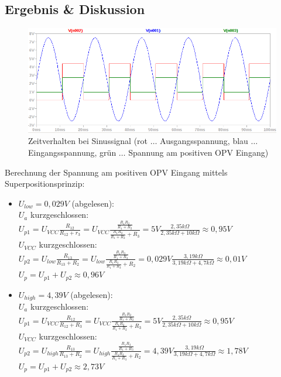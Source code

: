 \documentclass[12pt,a4paper,titlepage]{article}
\begin{document}
\subsection{Ergebnis \& Diskussion}

\begin{figure}[H]
  \centering
  \includegraphics[width=150mm]{schmitt_transient.png}
  \caption{Zeitverhalten bei Sinussignal (rot $\hdots$ Ausgangsspannung, blau $\hdots$ Eingangsspannung, gr\"un $\hdots$ Spannung am positiven OPV Eingang)}
\end{figure}

\noindent Berechnung der Spannung am positiven OPV Eingang mittels Superpositionsprinzip:

\begin{itemize}
  \item $U_{low} = 0,029V$ (abgelesen):\\
  $U_a$ kurzgeschlossen:\\
  $U_{p1} = U_{VCC}\frac{R_{12}}{R_{12}+r_3} = U_{VCC}\frac{\frac{R_1R_2}{R_1+R_2}}{\frac{R_1R_2}{R_1+R_2}+R_3} = 5V\frac{2,35k\Omega}{2,35k\Omega + 10k\Omega} \approx 0,95V$\\
  $U_{VCC}$ kurzgeschlossen:\\
  $U_{p2} = U_{low}\frac{R_{13}}{R_{13}+R_2} = U_{low}\frac{\frac{R_1R_3}{R_1+R_3}}{\frac{R_1R_3}{R_1+R_3}+R_2} = 0,029V\frac{3,19k\Omega}{3,19k\Omega + 4,7k\Omega} \approx 0,01V$\\
  $U_p = U_{p1} + U_{p2} \approx 0,96V$

  \item $U_{high} = 4,39V$ (abgelesen):\\
  $U_a$ kurzgeschlossen:\\
  $U_{p1} = U_{VCC}\frac{R_{12}}{R_{12}+R_3} = U_{VCC}\frac{\frac{R_1R_2}{R_1+R_2}}{\frac{R_1R_2}{R_1+R_2}+R_3} = 5V\frac{2,35k\Omega}{2,35k\Omega + 10k\Omega} \approx 0,95V$\\
  $U_{VCC}$ kurzgeschlossen:\\
  $U_{p2} = U_{high}\frac{R_{13}}{R_{13}+R_2} = U_{high}\frac{\frac{R_1R_3}{R_1+R_3}}{\frac{R_1R_3}{R_1+R_3}+R_2} = 4,39V\frac{3,19k\Omega}{3,19k\Omega + 4,7k\Omega} \approx 1,78V$\\
  $U_p = U_{p1} + U_{p2} \approx 2,73V$
\end{itemize}
\end{document}
